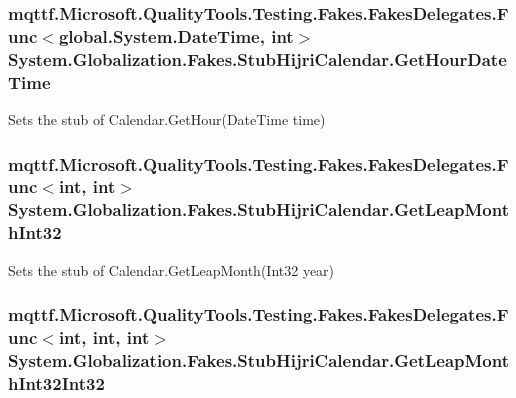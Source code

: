 \hypertarget{class_system_1_1_globalization_1_1_fakes_1_1_stub_hijri_calendar_a142ced7fe42069c812f3f6bc0b73ac21}{
\subsubsection[{Get\-Hour\-Date\-Time}]{\setlength{\rightskip}{0pt plus 5cm}mqttf.\-Microsoft.\-Quality\-Tools.\-Testing.\-Fakes.\-Fakes\-Delegates.\-Func$<$global.\-System.\-Date\-Time, int$>$ System.\-Globalization.\-Fakes.\-Stub\-Hijri\-Calendar.\-Get\-Hour\-Date\-Time}}\label{class_system_1_1_globalization_1_1_fakes_1_1_stub_hijri_calendar_a142ced7fe42069c812f3f6bc0b73ac21}


Sets the stub of Calendar.\-Get\-Hour(\-Date\-Time time)

\hypertarget{class_system_1_1_globalization_1_1_fakes_1_1_stub_hijri_calendar_a8ab7deb8c19696611affbdb9bb9853ad}{
\subsubsection[{Get\-Leap\-Month\-Int32}]{\setlength{\rightskip}{0pt plus 5cm}mqttf.\-Microsoft.\-Quality\-Tools.\-Testing.\-Fakes.\-Fakes\-Delegates.\-Func$<$int, int$>$ System.\-Globalization.\-Fakes.\-Stub\-Hijri\-Calendar.\-Get\-Leap\-Month\-Int32}}\label{class_system_1_1_globalization_1_1_fakes_1_1_stub_hijri_calendar_a8ab7deb8c19696611affbdb9bb9853ad}


Sets the stub of Calendar.\-Get\-Leap\-Month(\-Int32 year)

\hypertarget{class_system_1_1_globalization_1_1_fakes_1_1_stub_hijri_calendar_a35010643ae40908b71d7a19470837cc7}{
\subsubsection[{Get\-Leap\-Month\-Int32\-Int32}]{\setlength{\rightskip}{0pt plus 5cm}mqttf.\-Microsoft.\-Quality\-Tools.\-Testing.\-Fakes.\-Fakes\-Delegates.\-Func$<$int, int, int$>$ System.\-Globalization.\-Fakes.\-Stub\-Hijri\-Calendar.\-Get\-Leap\-Month\-Int32\-Int32}}\label{class_system_1_1_globalization_1_1_fakes_1_1_stub_hijri_calendar_a35010643ae40908b71d7a19470837cc7}


